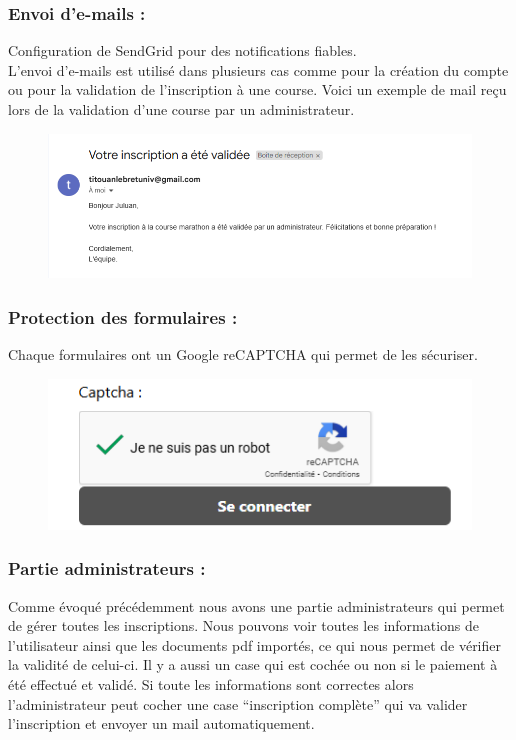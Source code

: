 \documentclass[12pt]{article} %
\begin{document}
        \subsubsection{Envoi d’e-mails :}
            Configuration de SendGrid pour des notifications fiables.\\
            L’envoi d’e-mails est utilisé dans plusieurs cas comme pour la création du compte ou pour la validation de l’inscription à une course. Voici un exemple de mail reçu lors de la validation d'une course par un administrateur.
    
            \begin{figure}[hbtp]
            \centering
            \includegraphics[scale=0.8]{images/validationMAIL.PNG}
            \end{figure}

        \subsubsection{Protection des formulaires :}
            Chaque formulaires ont un Google reCAPTCHA qui permet de les sécuriser.
            \begin{figure}[hbtp]
            \centering
            \includegraphics[scale=0.8]{images/Capture_captcha.PNG}
            \end{figure}
            
        \subsubsection{Partie administrateurs :}
            Comme évoqué précédemment nous avons une partie administrateurs qui permet de gérer toutes les inscriptions. Nous pouvons voir toutes les informations de l'utilisateur ainsi que les documents pdf importés, ce qui nous permet de vérifier la validité de celui-ci. Il y a aussi un case qui est cochée ou non si le paiement à été effectué et validé. Si toute les informations sont correctes alors l'administrateur peut cocher une case “inscription complète” qui va valider l’inscription et envoyer un mail automatiquement.
\end{document}
